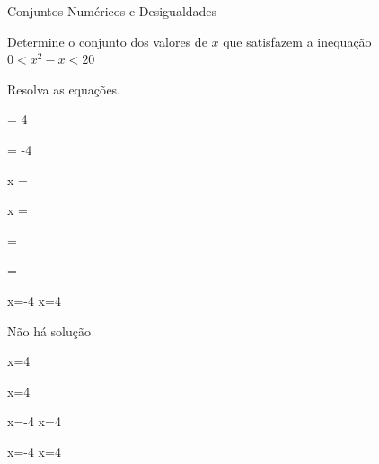 \begin{exercicios}{Conjuntos Numéricos e Desigualdades}
    \begin{exercicio}
        Determine o conjunto dos valores de $x$ que satisfazem a inequação $0 < x^2 - x < 20$
    \end{exercicio}

    \begin{exercicio} %
        Resolva as equações.
        \begin{mathlist}[3]
            \item {} = 4
            \item {} = -4
            \item x = 
            \item x = 
            \item {} = 
            \item {} = 
        \end{mathlist}
        \begin{answers}
            \begin{mathlist}[2]
                \item x=-4  x=4
                \item \) Não há solução
                \item x=4
                \item x=4
                \item x=-4  x=4 
                \item x=-4  x=4 
            \end{mathlist}
        \end{answers}
    \end{exercicio}


\end{exercicios}
